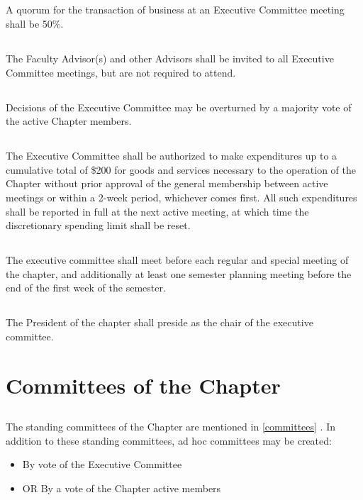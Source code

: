 \documentclass[10pt, oneside]{article}
\begin{document}
\subsection{}
A quorum for the transaction of business at an Executive Committee meeting shall be 50\%.

\subsection{}
The Faculty Advisor(s) and other Advisors shall be invited to all Executive Committee meetings, but are not required to attend.

\subsection{}
Decisions of the Executive Committee may be overturned by a majority vote of the active Chapter members.

\subsection{}
The Executive Committee shall be authorized to make expenditures up to a cumulative total of \$200 for goods and services necessary to the operation of the Chapter without prior approval of the general membership between active meetings or within a 2-week period, whichever comes first. All such expenditures shall be reported in full at the next active meeting, at which time the discretionary spending limit shall be reset.

\subsection{}
The executive committee shall meet before each regular and special meeting of the chapter, and additionally at least one semester planning meeting before the end of the first week of the semester.

\subsection{}
The President of the chapter shall preside as the chair of the executive committee.



\section{Committees of the Chapter}
\subsection{}
The standing committees of the Chapter are mentioned in \ref{committees} . In addition to these standing committees, ad hoc committees may be created:
\begin{itemize}
    \item By vote of the Executive Committee
    \item OR By a vote of the Chapter active members
\end{itemize}
\end{document}
